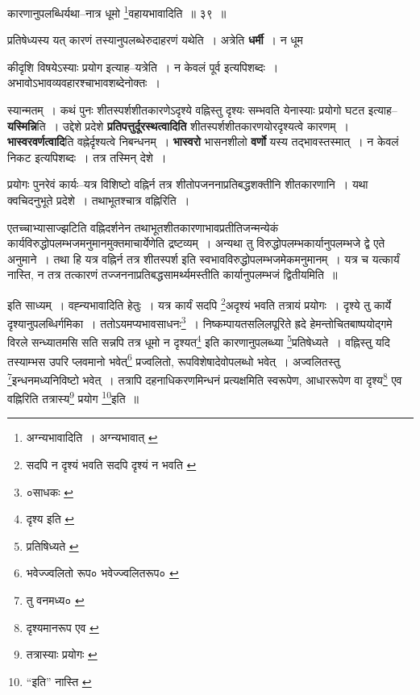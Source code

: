 \documentclass[article,12pt,a4paper]{memoir}
\begin{document}
	  \bigskip
	  \begingroup
	

	  \pstart कारणानुपलब्धिर्यथा--नात्र धूमो \footnote{अग्न्यभावादिति । \cite{dp-msB} \cite{dp-msD} \cite{dp-edP} \cite{dp-edH} \cite{dp-edN} अग्न्यभावात् \cite{dp-edE}}वहायभावादिति ॥ ३९ ॥
	\pend
      
	  \endgroup
	 

	  \pstart प्रतिषेध्यस्य यत् कारणं तस्यानुपलब्धेरुदाहरणं यथेति । अत्रेति \textbf{धर्मी} । न धूम
	\pend
      
	  \endgroup
	

	  \pstart कीदृशि विषयेऽस्याः प्रयोग इत्याह--यत्रेति । न केवलं पूर्व इत्यपिशब्दः । अभावोऽभावव्यवहारश्चाभावशब्देनोक्तः ।
	\pend
      

	  \pstart स्यान्मतम् । कथं पुनः शीतस्पर्शशीतकारणेऽदृश्ये वह्निस्तु दृश्यः सम्भवति येनास्याः प्रयोगो घटत इत्याह--\textbf{यस्मिन्नि}ति । उद्देशे प्रदेशे \textbf{प्रतिपत्तुर्दूरस्थत्वादिति} शीतस्पर्शशीतकारणयोरदृश्यत्वे कारणम् । \textbf{भास्वरवर्णत्वादि}ति वह्नेर्दृश्यत्वे निबन्धनम् । \textbf{भास्वरो} भासनशीलो \textbf{वर्णो} यस्य तद्भावस्तस्मात् । न केवलं निकट इत्यपिशब्दः । तत्र तस्मिन् देशे ।
	\pend
      

	  \pstart प्रयोगः पुनरेवं कार्यः--यत्र विशिष्टो वह्निर्न तत्र शीतोपजननाप्रतिबद्धशक्तीनि शीतकारणानि । यथा क्वचिदनुभूते प्रदेशे । तथाभूतश्चात्र वह्निरिति ।
	\pend
      

	  \pstart एतच्चाभ्यासाज्झटिति वह्निदर्शनेन तथाभूतशीतकारणाभावप्रतीतिजन्मन्येकं कार्यविरुद्धोपलम्भजमनुमानमुक्तमाचार्येणेति द्रष्टव्यम् । अन्यथा तु विरुद्धोपलम्भकार्यानुपलम्भजे द्वे एते अनुमाने । तथा हि यत्र वह्निर्न तत्र शीतस्पर्श इति स्वभावविरुद्धोपलम्भजमेकमनुमानम् । यत्र च यत्कार्यं नास्ति, न तत्र तत्कारणं तज्जननाप्रतिबद्धसामर्थ्यमस्तीति कार्यानुपलम्भजं द्वितीयमिति ॥
	\pend
      \leavevmode{}
	  \bigskip
	  \begingroup
	

	  \pstart इति साध्यम् । वह्न्यभावादिति हेतुः । यत्र कार्यं सदपि \footnote{सदपि न दृश्यं भवति \cite{dp-msC} सदपि दृश्यं न भवति \cite{dp-msA} \cite{dp-edP} \cite{dp-edH} \cite{dp-edE} \cite{dp-edN}}अदृश्यं भवति तत्रायं प्रयोगः । दृश्ये तु कार्ये दृश्यानुपलब्धिर्गमिका । ततोऽयमप्यभावसाधनः\footnote{०साधकः \cite{dp-msC}} । निष्कम्पायतसलिलपूरिते ह्रदे हेमन्तोचितबाष्पयोद्गमे विरले सन्ध्यातमसि सति सन्नपि तत्र धूमो न दृश्यत\footnote{दृश्य इति \cite{dp-msA} \cite{dp-edP} \cite{dp-edH} \cite{dp-edE} \cite{dp-edN}} इति कारणानुपलब्ध्या \footnote{प्रतिषिध्यते \cite{dp-msB}}प्रतिषेध्यते । वह्निस्तु यदि तस्याम्भस उपरि प्लवमानो भवेत्\footnote{भवेज्ज्वलितो रूप० \cite{dp-msA} \cite{dp-edP} \cite{dp-edH} \cite{dp-edN} भवेज्ज्वलितरूप० \cite{dp-edE}} प्रज्वलितो, रूपविशेषादेवोपलब्धो भवेत् । अज्वलितस्तु \footnote{तु वनमध्य० \cite{dp-msB}}इन्धनमध्यनिविष्टो भवेत् । तत्रापि दहनाधिकरणमिन्धनं प्रत्यक्षमिति स्वरूपेण, आधाररूपेण वा दृश्य\footnote{दृश्यमानरूप एव \cite{dp-msC}} एव वह्निरिति तत्रास्य\footnote{तत्रास्याः प्रयोगः \cite{dp-msA} \cite{dp-msB} \cite{dp-msC} \cite{dp-msD} \cite{dp-edP} \cite{dp-edH} \cite{dp-edE} \cite{dp-edN}} प्रयोग \footnote{“इति” नास्ति \cite{dp-msA} \cite{dp-msB} \cite{dp-edP} \cite{dp-edH} \cite{dp-edE} \cite{dp-edN}}इति ॥
	\pend
      
\end{document}
